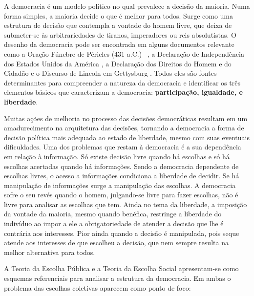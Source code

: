 


A democracia é um modelo político no qual prevalece a decisão da maioria. Numa forma simples, a maioria decide o que é melhor para todos. Surge como uma estrutura de decisão que contempla a vontade do homem livre, que deixa de submeter-se às arbitrariedades de tiranos, imperadores ou reis absolutistas. O desenho da democracia pode ser encontrada em alguns documentos relevante como a Oração Fúnebre de Péricles (431 a.C.)~ \cite{oracaoPericles}, a Declaração de Independência dos Estados Unidos da América \cite{euadeclara}, a Declaração dos Direitos do Homem e do Cidadão \cite{dcidadao} e o Discurso de Lincoln em Gettysburg \cite{dlincoln}. Todos eles são fontes determinantes para compreender a natureza da democracia e identificar  os três elementos básicos que caracterizam a democracia: \textbf{participação, igualdade, e liberdade}.

Muitas ações de melhoria no processo das decisões democráticas resultam em um amadurecimento na arquitetura das decisões, tornando a democracia a forma de decisão política mais adequada ao estado de liberdade, mesmo com suas eventuais dificuldades. Uma dos problemas que restam à democracia é a sua dependência em relação à informação. Só existe decisão livre quando há escolhas e só há escolhas acertadas quando há informações. Sendo a democracia dependente de escolhas livres, o acesso a informações condiciona a liberdade de decidir. Se há manipulação de informações surge a manipulação das escolhas. A democracia sofre o seu revés quando o homem, julgando-se livre para fazer escolhas, não é livre para analisar as escolhas que tem. 
Ainda no tema da liberdade, a imposição da vontade da maioria, mesmo quando benéfica, restringe a liberdade do indivíduo ao impor a ele a obrigatoriedade de atender a decisão que lhe é contrária aos interesses. Pior ainda quando a decisão é manipulada, pois seque atende aos interesses de que escolheu a decisão, que nem sempre resulta na melhor alternativa para todos. 

A Teoria da Escolha Pública e a Teoria da Escolha Social apresentam-se como esquemas referenciais para analisar a estrutura da democracia. Em ambas o problema das escolhas coletivas aparecem como ponto de foco:

